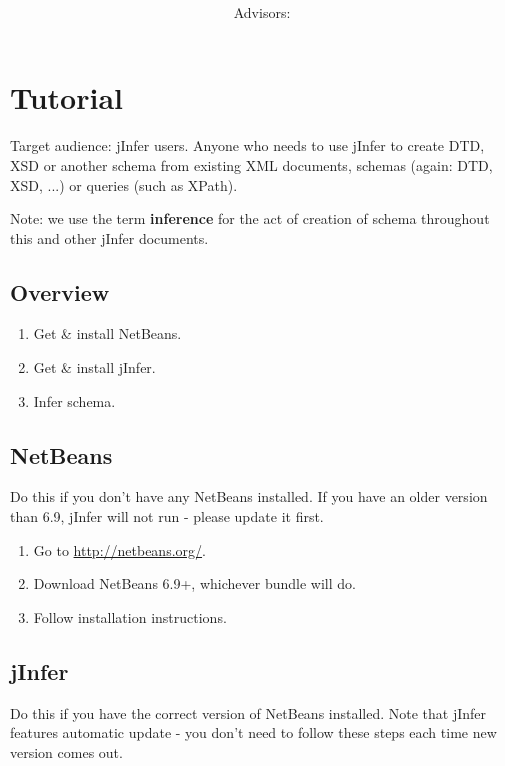 \documentclass[a4paper,10pt,oneside]{article}
\title{\bf\mftitle}
\author{\mfauthor \\ Advisors: \mfadvisor}
\date{\mfplacedate}
\begin{document}
\maketitle


 \section*{Tutorial}
        \par 
          Target audience: jInfer users. Anyone who needs to use jInfer to create DTD, XSD or another schema from existing XML documents, schemas (again: DTD, XSD, ...) or queries (such as XPath).
        
        \par 
          Note: we use the term \textbf{inference} for the act of creation of schema throughout this and other jInfer documents.
        
\subsection*{Overview}
\begin{enumerate}
  \item Get \& install NetBeans.
  \item Get \& install jInfer.
  \item Infer schema.
\end{enumerate}
\subsection*{NetBeans}
\par 
  Do this if you don't have any NetBeans installed. If you have an older version than 6.9, jInfer will not run - please update it first.

\begin{enumerate}
  \item Go to \url{http://netbeans.org/}.
  \item Download NetBeans 6.9+, whichever bundle will do.
  \item Follow installation instructions.
  
\end{enumerate}
\subsection*{jInfer}
\par 
  Do this if you have the correct version of NetBeans installed. Note that jInfer features automatic update - you don't need to follow these steps each time new version comes out.
\end{document}
